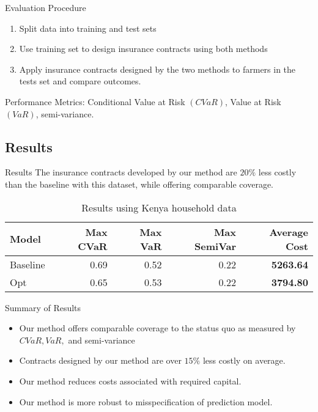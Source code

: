 \documentclass{beamer}
\begin{document}
\begin{frame}{Evaluation Procedure}
\begin{enumerate}
\setlength\itemsep{2em}
    \item Split data into training and test sets
    \item Use training set to design insurance contracts using both methods
    \item Apply insurance contracts designed by the two methods to farmers in the tests set and compare outcomes. 
\end{enumerate}
Performance Metrics: Conditional Value at Risk $(CVaR)$, Value at Risk $(VaR)$, semi-variance.
\end{frame}

\subsection{Results}
\begin{frame}{Results}
 The insurance contracts developed by our method are $20\%$ less costly than the baseline with this dataset, while offering comparable coverage. 

 \begin{table}[]
\small
    \centering
\begin{tabular}{lrrrr}
\toprule
   Model &  Max CVaR &  Max VaR &  Max SemiVar &   Average Cost \\
\midrule
Baseline &      0.69 &     0.52 &         0.22 &             \textbf{5263.64} \\
     Opt &      0.65 &     0.53 &         0.22 &            \textbf{3794.80} \\
\bottomrule
\end{tabular}
    \caption{Results using Kenya household data}
    
\end{table}
    
\end{frame}

\begin{frame}{Summary of Results}
    \begin{itemize}
        \setlength\itemsep{1.5em}
            \item Our method offers comparable coverage to the status quo as measured by $CVaR, VaR,$ and semi-variance
            \item Contracts designed by our method are over $15\%$ less costly on average.
            \item Our method reduces costs associated with required capital. 
            \item Our method is more robust to misspecification of prediction model. 
        \end{itemize}
    
\end{frame}
\end{document}
